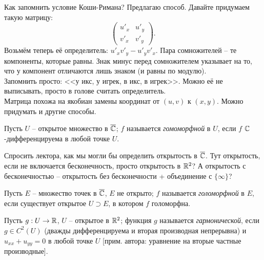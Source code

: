 \begin{anote}
	Как запомнить условие Коши-Римана? Предлагаю способ. Давайте придумаем такую матрицу:
	\[
		\begin{pmatrix}
			{u'}_x & {u'}_y \\
			{v'}_x & {v'}_y
		\end{pmatrix}.
	\]
	Возьмём теперь её определитель: ${u'}_x {v'}_y - {u'}_y {v'}_x$. Пара сомножителей -- те компоненты, которые равны. Знак минус перед сомножителем указывает на то, что у компонент отличаются лишь знаком (и равны по модулю). \\
	Запомнить просто: <<у икс, у игрек, в икс, в игрек>>. Можно её не выписывать, просто в голове считать определитель. \\
	Матрица похожа на якобиан замены координат от $(u, v)$ к $(x, y)$. Можно придумать и другие способы.
\end{anote}

\begin{definition}
	Пусть $U$ -- открытое множество в $\overline{\mathbb{C}}$; $f$ называется \emph{гомоморфной} в $U$, если $f$ $\mathbb{C}$-дифференцируема в любой точке $U$. 
\end{definition}

{\color{red} Спросить лектора, как мы могли бы определить открытость в $\overline{\mathbb{C}}$. Тут открытость, если не включается бесконечность, просто открытость в $\mathbb{R}^2$? А открытость с бесконечностью -- открытость без бесконечности + объединение с $\{ \infty \}$?}

\begin{definition}
	Пусть $E$ -- множество точек в $\overline{\mathbb{C}}$, $E$ не открыто; $f$ называется \emph{голоморфной} в $E$, если существует открытое $U \supset E$, в котором $f$ голоморфна.
\end{definition}

\begin{definition}
	Пусть $g: U \to \mathbb{R}$, $U$ -- открытое в $\mathbb{R}^2$; функция $g$ называется \emph{гармонической}, если $g \in C^2(U)$ (дважды дифференцируема и вторая производная непрерывна) и $u_{xx} + u_{yy} = 0$ в любой точке $U$ [прим. автора: уравнение на вторые частные производные].
\end{definition}

